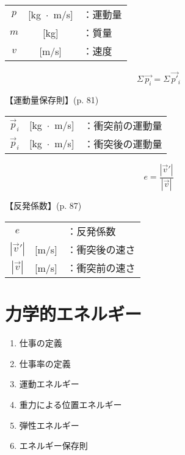 \documentclass[10pt]{jarticle}
\begin{document}
\begin{tabular}{ccl}
$p$	&[kg $\!\! \cdot \!\!$ m/s]	&：運動量\\
$m$	&[kg]	&：質量\\
$v$	&[m/s]	&：速度
\end{tabular}






\newpage
\[
	\Sigma \, \vec{p_i} = \Sigma \, \vec{p'}\!_i
\]

\vskip3mm
【運動量保存則】{\footnotesize (p. 81)}

\begin{tabular}{ccl}
$\vec{p}_i$	&[kg $\!\! \cdot \!\!$ m/s]	&：衝突前の運動量\\
$\vec{p}_i$	&[kg $\!\! \cdot \!\!$ m/s]	&：衝突後の運動量
\end{tabular}





\newpage
\[
	e = \frac{|\vec{v}'|}{|\vec{v}|}
\]


\vskip3mm
【反発係数】{\footnotesize (p. 87)}

\begin{tabular}{ccl}
$e$	&	&：反発係数\\
$|\vec{v}'|$	&[m/s]	&：衝突後の速さ\\
$|\vec{v}|$	&[m/s]	&：衝突前の速さ
\end{tabular}





\newpage
\addtocounter{page}{-1}
\thispagestyle{empty}
\section{力学的エネルギー}

\begin{enumerate}
\setcounter{enumi}{\thepage}
\small
\itemsep-4mm
\item 仕事の定義\\
\item 仕事率の定義\\
\item 運動エネルギー\\
\item 重力による位置エネルギー\\
\item 弾性エネルギー\\
\item エネルギー保存則
\end{enumerate}
\end{document}
